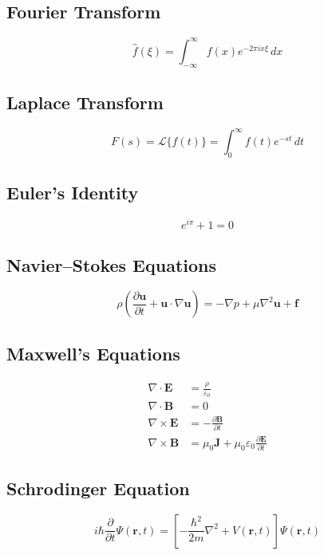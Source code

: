 \documentclass[11pt]{article}
\begin{document}
\subsection{Fourier Transform}
\begin{equation}
  \hat{f}(\xi) = \int_{-\infty}^{\infty} f(x) e^{-2\pi i x \xi}\,dx
\end{equation}

\subsection{Laplace Transform}
\begin{equation}
  F(s) = \mathcal{L}\{f(t)\} = \int_0^{\infty} f(t) e^{-st}\,dt
\end{equation}

\subsection{Euler's Identity}
\begin{equation}
  e^{i\pi} + 1 = 0
\end{equation}

\subsection{Navier--Stokes Equations}
\begin{equation}
  \rho\left(\frac{\partial \mathbf{u}}{\partial t} + \mathbf{u} \cdot \nabla \mathbf{u}\right)
  = -\nabla p + \mu \nabla^2 \mathbf{u} + \mathbf{f}
\end{equation}

\subsection{Maxwell's Equations}
\begin{align}
  \nabla \cdot \mathbf{E} &= \frac{\rho}{\varepsilon_0} \\
  \nabla \cdot \mathbf{B} &= 0 \\
  \nabla \times \mathbf{E} &= -\frac{\partial \mathbf{B}}{\partial t} \\
  \nabla \times \mathbf{B} &= \mu_0 \mathbf{J} + \mu_0 \varepsilon_0 \frac{\partial \mathbf{E}}{\partial t}
\end{align}

\subsection{Schrodinger Equation}
\begin{equation}
  i\hbar \frac{\partial}{\partial t} \Psi(\mathbf{r}, t)
  = \left[-\frac{\hbar^2}{2m}\nabla^2 + V(\mathbf{r}, t)\right]\Psi(\mathbf{r}, t)
\end{equation}
\end{document}
